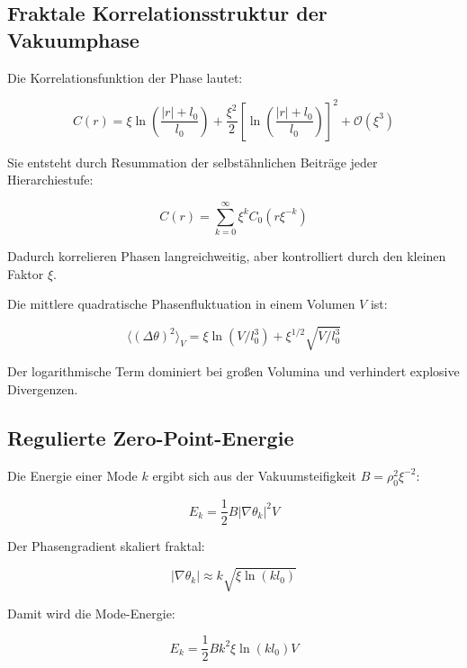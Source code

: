 	\subsection*{Fraktale Korrelationsstruktur der Vakuumphase}
	
	Die Korrelationsfunktion der Phase lautet:
	
	\begin{equation}
		C(r) = \xi \ln \left( \frac{|r| + l_0}{l_0} \right) + \frac{\xi^2}{2} \left[ \ln \left( \frac{|r| + l_0}{l_0} \right) \right]^2 + \mathcal{O}(\xi^3)
	\end{equation}
	
	Sie entsteht durch Resummation der selbstähnlichen Beiträge jeder Hierarchiestufe:
	
	\begin{equation}
		C(r) = \sum_{k=0}^\infty \xi^k C_0(r \xi^{-k})
	\end{equation}
	
	Dadurch korrelieren Phasen langreichweitig, aber kontrolliert durch den kleinen Faktor \(\xi\).
	
	Die mittlere quadratische Phasenfluktuation in einem Volumen \(V\) ist:
	
	\begin{equation}
		\langle (\Delta \theta)^2 \rangle_V = \xi \ln(V / l_0^3) + \xi^{1/2} \sqrt{V / l_0^3}
	\end{equation}
	
	Der logarithmische Term dominiert bei großen Volumina und verhindert explosive Divergenzen.
	
	\subsection*{Regulierte Zero-Point-Energie}
	
	Die Energie einer Mode \(k\) ergibt sich aus der Vakuumsteifigkeit \(B = \rho_0^2 \xi^{-2}\):
	
	\begin{equation}
		E_k = \frac{1}{2} B |\nabla \theta_k|^2 V
	\end{equation}
	
	Der Phasengradient skaliert fraktal:
	
	\begin{equation}
		|\nabla \theta_k| \approx k \sqrt{\xi \ln(k l_0)}
	\end{equation}
	
	Damit wird die Mode-Energie:
	
	\begin{equation}
		E_k = \frac{1}{2} B k^2 \xi \ln(k l_0) V
	\end{equation}
	
